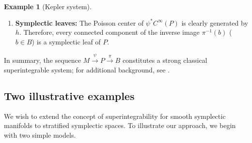 \documentclass[12pt]{amsart}
\theoremstyle{definition}
\newtheorem{example}[theorem]{Example}
\numberwithin{equation}{section}
\newcommand{\Cinf}{C^\infty}
\begin{document}
\begin{example}[Kepler system]
\begin{enumerate}
			
		\item \textbf{Symplectic leaves:} The Poisson center of $\psi^*\Cinf(P)$ is clearly generated by $h$. Therefore, every connected component of the inverse image $\pi^{-1}(b)$ ($b\in B$) is a symplectic leaf of $P$. %
	\end{enumerate}
In summary, the sequence $M \overset{\psi}{\longrightarrow} P \overset{\pi}{\longrightarrow} B$ constitutes a strong classical superintegrable system; for additional background, see \cite{Old-review,Keplerbook}.\end{example}
 
  
  

\subsection{Two illustrative examples}\label{Ex:partitionnotstratified}
We wish to extend  the concept of superintegrability for smooth symplectic manifolds to stratified symplectic spaces. To illustrate our  approach, we begin with two simple models.
\end{document}
